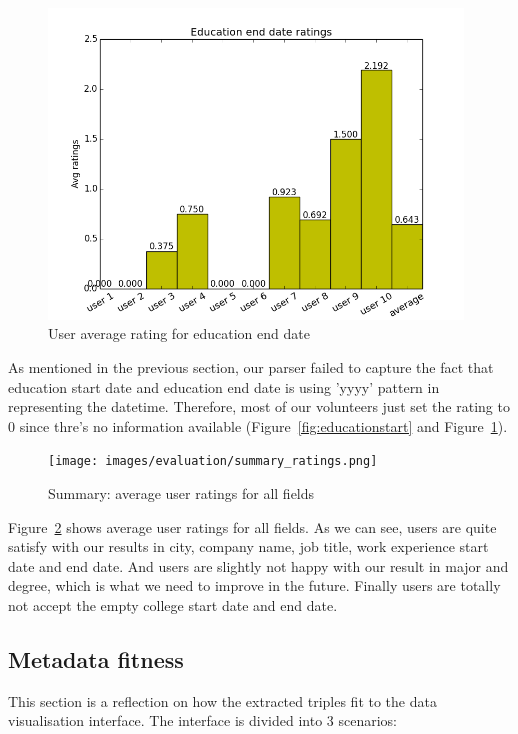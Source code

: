 \begin{figure}[H]
\centering
\includegraphics[width=110mm]{images/evaluation/average_education_end_date_score.png}
\caption{User average rating for education end date}
\label{fig:educationend}
\end{figure}

As mentioned in the previous section, our parser failed to capture the fact that education start date and education end date is using 'yyyy' pattern in representing the datetime. Therefore, most of our volunteers just set the rating to 0 since thre's no information available (Figure~\ref{fig:educationstart} and Figure~\ref{fig:educationend}).

\begin{figure}
	\centering
	\texttt{[image: images/evaluation/summary\_ratings.png]}
	\caption{Summary: average user ratings for all fields}
	\label{fig:SummaryRatings}
\end{figure}

Figure~\ref{fig:SummaryRatings} shows average user ratings for all fields. As we can see, users are quite satisfy with our results in city, company name, job title, work experience start date and end date. And users are slightly not happy with our result in major and degree, which is what we need to improve in the future. Finally users are totally not accept the empty college start date and end date.

\subsection{Metadata fitness}

This section is a reflection on how the extracted triples fit to the data visualisation interface. The interface is divided into 3 scenarios: 

